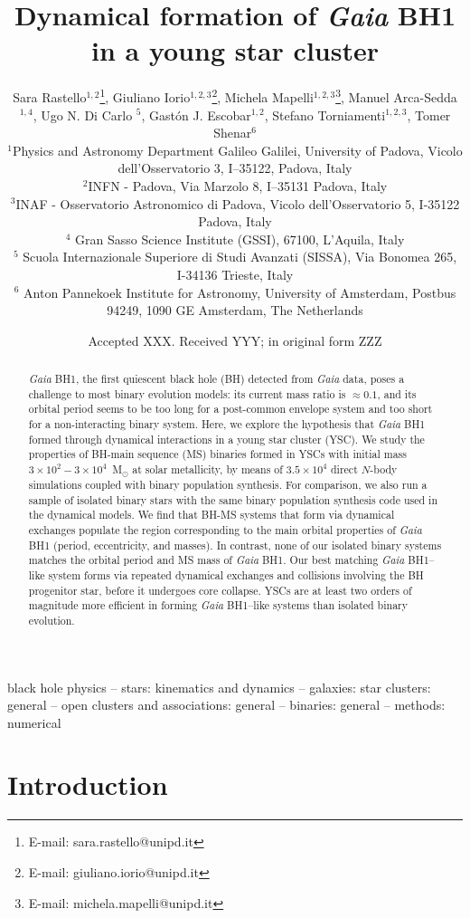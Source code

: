 \documentclass[fleqn,usenatbib]{mnras}
\title[Dynamical 
formation of \textit{Gaia} BH1]
{Dynamical 
formation of \textit{Gaia} BH1 in a young star cluster}
\author[S. Rastello et al.]{
\newauthor Sara Rastello$^{1,2}$\thanks{E-mail: sara.rastello@unipd.it}, 
Giuliano Iorio$^{1,2,3}$\thanks{E-mail: giuliano.iorio@unipd.it}, 
Michela Mapelli$^{1,2,3}$\thanks{E-mail: michela.mapelli@unipd.it},
Manuel Arca-Sedda$^{1,4}$, Ugo N. Di Carlo $^{5}$, \newauthor Gast\'on J. Escobar$^{1,2}$,
Stefano Torniamenti$^{1,2,3}$, Tomer Shenar$^{6}$\\
$^{1}$Physics and Astronomy Department Galileo Galilei, University of Padova, Vicolo dell'Osservatorio 3, I--35122, Padova, Italy\\
$^{2}$INFN - Padova, Via Marzolo 8, I--35131 Padova, Italy\\
$^{3}$INAF - Osservatorio Astronomico di Padova, Vicolo dell'Osservatorio 5, I-35122 Padova, Italy\\
$^{4}$ Gran Sasso Science Institute (GSSI), 67100, L’Aquila, Italy\\
$^{5}$ Scuola Internazionale Superiore di Studi Avanzati (SISSA), Via Bonomea 265, I-34136 Trieste, Italy \\
$^{6}$ Anton Pannekoek Institute for Astronomy, University of Amsterdam, Postbus 94249, 1090 GE Amsterdam, The Netherlands\\
}
\date{Accepted XXX. Received YYY; in original form ZZZ}
\newcommand{\bh}{\textit{Gaia} BH1}
\begin{document}
\label{firstpage}
\pagerange{\pageref{firstpage}--\pageref{lastpage}}
\maketitle

\begin{abstract}
\bh, the first quiescent black hole (BH) detected from {\it Gaia} data, poses a challenge to most binary evolution models: its current mass ratio is  $\approx{0.1}$, and its orbital period seems to be too long for a post-common envelope system and too short for a non-interacting binary system. Here, we explore the hypothesis that {\it Gaia} BH1 formed through dynamical interactions in a young star cluster (YSC). We study the properties of BH-main sequence (MS) binaries formed in YSCs with initial mass $3\times{}10^2-3\times{}10^4$~M$_\odot$ at solar metallicity, by means of $3.5\times{}10^4$ direct $N$-body simulations coupled with binary population synthesis. For comparison, we also run a sample of isolated binary stars with the same binary population synthesis code used in the dynamical models. We find that  BH-MS systems that form via dynamical exchanges populate the region corresponding to the main orbital properties of \bh{} (period, eccentricity, and masses). In contrast, none of our isolated binary systems matches the orbital period and MS mass of \bh{}. Our best matching \bh--like system forms via repeated dynamical exchanges and collisions involving the BH progenitor star, before it undergoes core collapse. YSCs are at least two orders of magnitude more efficient in forming \bh--like systems than isolated binary evolution.



\end{abstract}

\begin{keywords}
black hole physics -- stars: kinematics and dynamics -- galaxies: star clusters: general -- open clusters and associations: general -- binaries: general -- methods: numerical

\end{keywords}





\section{Introduction}
\label{sec:intro}
\end{document}
